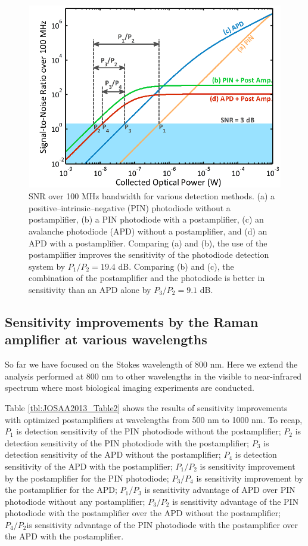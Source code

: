 \begin{figure}[htb!]
\centering
\includegraphics[scale=1]{JOSAA2013/Figure4.png}
\caption{SNR over 100 MHz bandwidth for various detection methods. (a) a positive--intrinsic--negative (PIN) photodiode without a postamplifier, (b) a PIN photodiode with a postamplifier, (c) an avalanche photodiode (APD) without a postamplifier, and (d) an APD with a postamplifier. Comparing (a) and (b), the use of the postamplifier improves the sensitivity of the photodiode detection system by $P_1/P_2 = 19.4$ dB. Comparing (b) and (c), the combination of the postamplifier and the photodiode is better in sensitivity than an APD alone by $P_3 / P_2 = 9.1$ dB.}
\label{fig:JOSAA2013_Figure4}
\end{figure}

\subsection{Sensitivity improvements by the Raman amplifier at various wavelengths}

So far we have focused on the Stokes wavelength of 800 nm. Here we extend the analysis performed at 800 nm to other wavelengths in the visible to near-infrared spectrum where most biological imaging experiments are conducted.

Table \ref{tbl:JOSAA2013_Table2} shows the results of sensitivity improvements with optimized postamplifiers at wavelengths from 500 nm to 1000 nm. To recap, $P_1$ is detection sensitivity of the PIN photodiode without the postamplifier; $P_2$ is detection sensitivity of the PIN photodiode with the postamplifier; $P_3$ is detection sensitivity of the APD without the postamplifier; $P_4$ is detection sensitivity of the APD with the postamplifier; $P_1/P_2$ is sensitivity improvement by the postamplifier for the PIN photodiode; $P_3/P_4$ is sensitivity improvement by the postamplifier for the APD; $P_1/P_3$ is sensitivity advantage of APD over PIN photodiode without any postamplifier; $P_3/P_2$ is sensitivity advantage of the PIN photodiode with the postamplifier over the APD without the postamplifier; $P_4/P_2$is sensitivity advantage of the PIN photodiode with the postamplifier over the APD with the postamplifier.

